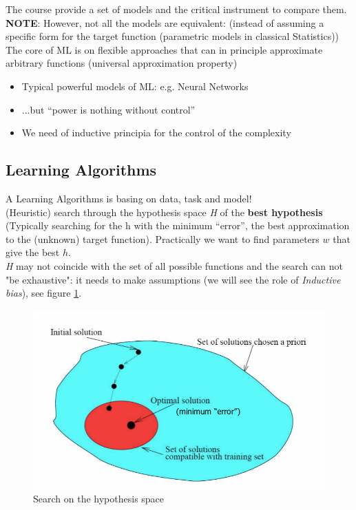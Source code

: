 \documentclass[../main.tex]{subfiles}
\begin{document}
The course provide a set of models and the critical instrument to compare them.\\

\textbf{NOTE}: However, not all the models are equivalent: (instead of assuming a specific form for the target function (parametric models in classical Statistics))\\
The core of ML is on flexible approaches that can in principle approximate arbitrary functions (universal approximation property)
\begin{itemize}
    \item Typical powerful models of ML: e.g. Neural Networks
    \item ...but “power is nothing without control”
    \item We need of inductive principia for the control of the complexity
\end{itemize}
\subsection{Learning Algorithms}
A Learning Algorithms is basing on data, task and model!\\
(Heuristic) search through the hypothesis space \emph{H} of the \textbf{best hypothesis} (Typically searching for the h with the minimum “error”, the best approximation to the (unknown) target function). Practically we want to find parameters $w$ that give the best $h$.\\
\newline
\emph{H} may not coincide with the set of all possible functions and the search can not "be exhaustive": it needs to make assumptions (we will see the role of \emph{Inductive bias}), see figure \ref{fig:lern_search}.

\begin{figure}[H]
    \centering
    \includegraphics[scale = 0.35]{lectures/1_Introduction/intro_search.png}
    \caption{Search on the hypothesis space}
    \label{fig:lern_search}
\end{figure}
\end{document}

